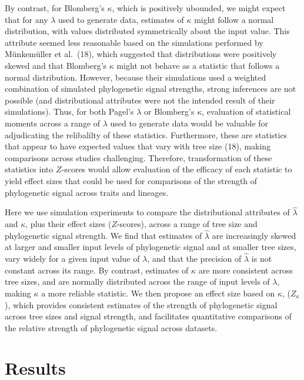 \documentclass[9pt,twocolumn,twoside,lineno]{pnas-new}
\begin{document}
By contrast, for Blomberg's \(\kappa\), which is positively ubounded, we
might expect that for any \(\lambda\) used to generate data, estimates
of \(\kappa\) might follow a normal distribution, with values
distributed symmetrically about the input value. This attribute seemed
less reasonable based on the simulations performed by Münkemüller et
al.~(18), which suggested that distributions were positively skewed and
that Blomberg's \(\kappa\) might not behave as a statistic that follows
a normal distribution. However, because their simulations used a
weighted combination of simulated phylogenetic signal strengths, strong
inferences are not possible (and distributional attributes were not the
intended result of their simulations). Thus, for both Pagel's
\(\lambda\) or Blomberg's \(\kappa\), evaluation of statistical moments
across a range of \(\lambda\) used to generate data would be valuable
for adjudicating the relibalilty of these statistics. Furthermore, these
are statistics that appear to have expected values that vary with tree
size (18), making comparisons across studies challenging. Therefore,
transformation of these statistics into \(Z\)-scores would allow
evaluation of the efficacy of each statistic to yield effect sizes that
could be used for comparisons of the strength of phylogenetic signal
across traits and lineages.

Here we use simulation experiments to compare the distributional
attributes of \(\hat{\lambda}\) and \(\kappa\), plus their effect sizes
(\(Z\)-scores), across a range of tree size and phylogenetic signal
strength. We find that estimates of \(\hat{\lambda}\) are increasingly
skewed at larger and smaller input levels of phylogenetic signal and at
smaller tree sizes, vary widely for a given input value of \(\lambda\),
and that the precision of \(\hat{\lambda}\) is not constant across its
range. By contrast, estimates of \(\kappa\) are more consistent across
tree sizes, and are normally distributed across the range of input
levels of \(\lambda\), making \(\kappa\) a more reliable statistic. We
then propose an effect size based on \(\kappa\), (\(Z_{\kappa}\)), which
provides consistent estimates of the strength of phylogenetic signal
across tree sizes and signal strength, and facilitates quantitative
comparisons of the relative strength of phylogenetic signal across
datasets.

\hypertarget{results}{%
\section{Results}\label{results}}
\end{document}
